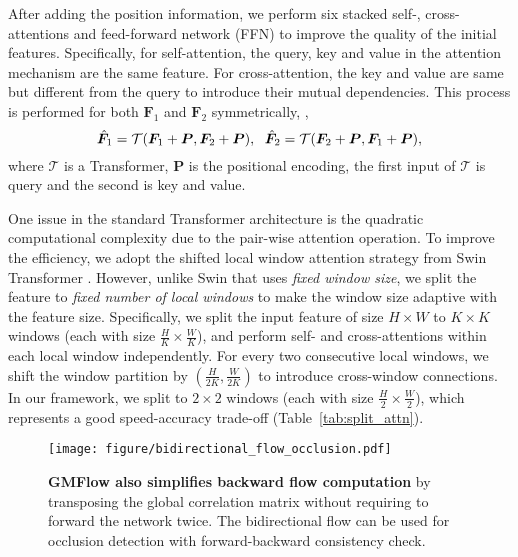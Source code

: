 \documentclass[10pt,twocolumn,letterpaper]{article}
\begin{document}
After adding the position information, we perform six stacked self-, cross-attentions and feed-forward network (FFN) \cite{vaswani2017attention} to improve the quality of the initial features. Specifically, for self-attention, the query, key and value in the attention mechanism \cite{vaswani2017attention} are the same feature. For cross-attention, the key and value are same but different from the query to introduce their mutual dependencies. This process is performed for both ${\bm F}_1$ and ${\bm F}_2$ symmetrically, \ie,
\begin{equation}
\label{eq:trans_feature}
    \hat{\bm F}_1 = \mathcal{T}({\bm F}_1 + {\bm P}, {\bm F}_2 + {\bm P}), \hspace{0.6em} \hat{\bm F}_2 = \mathcal{T}({\bm F}_2 + {\bm P}, {\bm F}_1 + {\bm P}),
\end{equation}
where $\mathcal{T}$ is a Transformer, ${\bm P}$ is the positional encoding, the first input of $\mathcal{T}$ is query and the second is key and value.

One issue in the standard Transformer architecture \cite{vaswani2017attention} is the quadratic computational complexity due to the pair-wise attention operation. To improve the efficiency, we adopt the shifted local window attention strategy from Swin Transformer \cite{liu2021Swin}. However, unlike Swin that uses \emph{fixed window size}, we split the feature to \emph{fixed number of local windows} to make the window size adaptive with the feature size. Specifically, we split the input feature of size $H \times W$ to $K \times K$ windows (each with size $\frac{H}{K} \times \frac{W}{K}$), and perform self- and cross-attentions within each local window independently. For every two consecutive local windows, we shift the window partition by $(\frac{H}{2K}, \frac{W}{2K})$ to introduce cross-window connections. In our framework, we split to $2 \times 2$ windows (each with size $\frac{H}{2} \times \frac{W}{2}$), which represents a good speed-accuracy trade-off (Table~\ref{tab:split_attn}).



\begin{figure}[t]
    \centering
    \texttt{[image: figure/bidirectional\_flow\_occlusion.pdf]}
    \vspace{-6pt}
    \caption{\textbf{GMFlow also simplifies backward flow computation} by transposing the global correlation matrix without requiring to forward the network twice. The bidirectional flow can be used for occlusion detection with forward-backward consistency check.}
    \label{fig:bidir_flow}
    \vspace{-12pt}
\end{figure}
\end{document}
